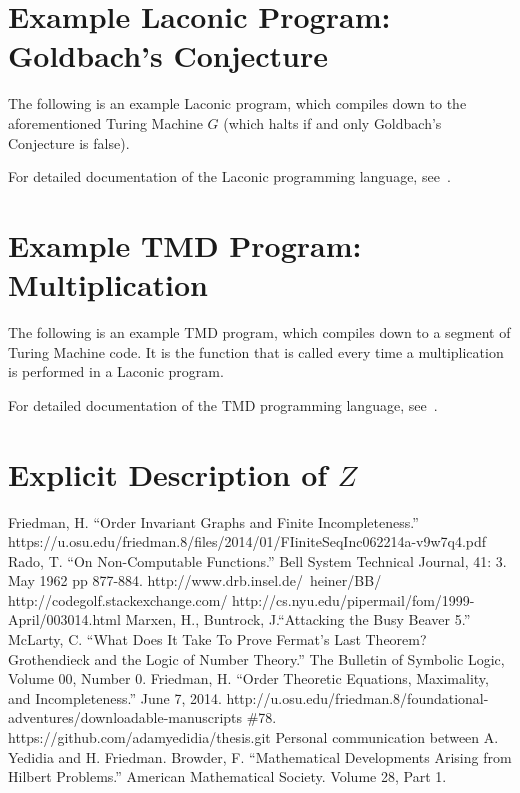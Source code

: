 \documentclass[11pt]{article}
\begin{document}
\begin{appendices}
    
\section{Example Laconic Program: Goldbach's Conjecture}

The following is an example Laconic program, which compiles down to the aforementioned Turing Machine $G$ (which halts if and only Goldbach's Conjecture is false).



For detailed documentation of the Laconic programming language, see~\cite{github}.

\section{Example TMD Program: Multiplication}

The following is an example TMD program, which compiles down to a segment of Turing Machine code. It is the function that is called every time a multiplication is performed in a Laconic program.

%

For detailed documentation of the TMD programming language, see~\cite{github}.

\section{Explicit Description of $Z$}



\end{appendices}

\begin{thebibliography}{100}
 Friedman, H. ``Order Invariant Graphs and Finite Incompleteness.'' https://u.osu.edu/friedman.8/files/2014/01/FIiniteSeqInc062214a-v9w7q4.pdf
 Rado, T. ``On Non-Computable Functions.'' 
Bell System Technical Journal, 41: 3. May 1962 pp 877-884.
 http://www.drb.insel.de/~heiner/BB/
 http://codegolf.stackexchange.com/
 http://cs.nyu.edu/pipermail/fom/1999-April/003014.html
 Marxen, H., Buntrock, J.``Attacking the Busy Beaver 5.'' 
 McLarty, C. ``What Does It Take To Prove Fermat's Last Theorem? Grothendieck and the Logic of Number Theory.'' The Bulletin of Symbolic Logic, Volume 00, Number 0.
 Friedman, H. ``Order Theoretic Equations, Maximality, and Incompleteness.'' June 7, 2014. http://u.osu.edu/friedman.8/foundational-adventures/downloadable-manuscripts \#78.
 https://github.com/adamyedidia/thesis.git
 Personal communication between A. Yedidia and H. Friedman.
 Browder, F. ``Mathematical Developments Arising from Hilbert Problems.'' American Mathematical Society. Volume 28, Part 1.
\end{thebibliography}
\end{document}
